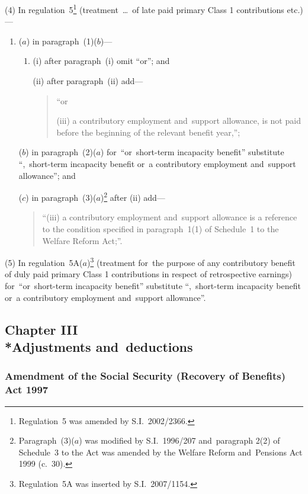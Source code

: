 \documentclass[12pt,a4paper]{article}
\begin{document}
(4) In regulation~5\footnote{Regulation~5 was amended by S.I.~2002/2366.} (treatment~\dots\ of late paid primary Class 1 contributions etc.)—
\begin{enumerate}\item[]
($a$) in paragraph~(1)($b$)—
\begin{enumerate}\item[]
(i) after paragraph~(i)  omit “or”; and

(ii) after paragraph~(ii)  add—
\begin{quotation}
“or

(iii) a contributory employment and~support allowance, is not paid before the beginning of the relevant benefit year,”;
\end{quotation}
\end{enumerate}

($b$) in paragraph~(2)($a$)  for~“or~short-term incapacity benefit” substitute “,~short-term incapacity benefit or~a contributory employment and~support allowance”; and

($c$) in paragraph~(3)($a$)\footnote{Paragraph~(3)($a$) was modified by S.I.~1996/207 and~paragraph 2(2) of Schedule~3 to the Act was amended by the Welfare Reform and~Pensions Act 1999 (c.~30).} after (ii)  add—
\begin{quotation}
“(iii) a contributory employment and~support allowance is a reference to the condition specified in paragraph~1(1) of Schedule~1 to the Welfare Reform Act;”.
\end{quotation}
\end{enumerate}

(5) In regulation~5A($a$)\footnote{Regulation~5A was inserted by S.I.~2007/1154.} (treatment for~the purpose of any contributory benefit of duly paid primary Class 1 contributions in respect of retrospective earnings) for~“or~short-term incapacity benefit” substitute “,~short-term incapacity benefit or~a contributory employment and~support allowance”.

\subsection[Chapter III --- Adjustments and~deductions]{Chapter III\\*Adjustments and~deductions}

\renewcommand\parthead{--- Part V Chapter III}

\subsubsection[50. Amendment of the Social Security (Recovery of Benefits) Act 1997]{Amendment of the Social Security (Recovery of Benefits) Act 1997}
\end{document}
